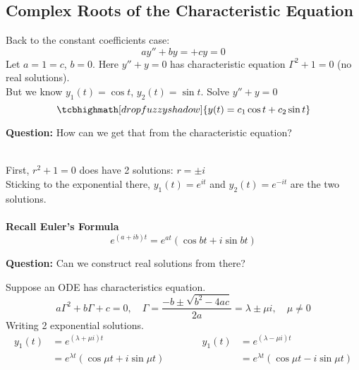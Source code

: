 \subsection*{Complex Roots of the Characteristic Equation}
Back to the constant coefficients case:
\begin{equation*}
	ay'' + by= + cy = 0 \tag{$\star$}
\end{equation*}
Let $a = 1 = c$, $b = 0$. Here $y'' + y = 0$ has characteristic equation $\Gamma^2 + 1 = 0$ (no real solutions).\\
But we know $y_1(t) = \cos t$, $y_2(t) = \sin t$. Solve $y'' + y = 0$
\begin{equation*}
	\tcbhighmath[drop fuzzy shadow]{y(t) = c_1 \cos t + c_2 \sin t}
\end{equation*}
\redhline
\begin{center}
	\textbf{Question:} How can we get that from the characteristic equation?
\end{center}
\redhline\\
First, $r^2 + 1 = 0$ does have 2 solutions: $r = \pm i$\\
Sticking to the exponential there, $y_1(t) = e^{it}$ and $y_2(t) = e^{-it}$ are the two solutions.\\\\
\textbf{Recall Euler's Formula}
\begin{equation*}
	e^{(a + ib)t} = e^{at}(\cos bt + i \sin bt)
\end{equation*}
\redhline
\begin{center}
	\textbf{Question:} Can we construct real solutions from there?
\end{center}
Suppose an ODE has characteristics equation.
\begin{equation*}
	a\Gamma^2 + b \Gamma + c = 0, \quad \Gamma = \frac{-b \pm \sqrt{b^2 - 4ac}}{2a} = \lambda \pm \mu i, \quad \mu \neq 0 
\end{equation*}
Writing 2 exponential solutions.
\begin{equation*}
	\begin{split}
			y_1(t) & = e^{(\lambda + \mu i)t}\\
			& = e^{\lambda t}(\cos \mu t + i\sin \mu t)
	\end{split}
	\quad \quad \quad 
	\begin{split}
			y_1(t) & = e^{(\lambda - \mu i)t}\\
			& = e^{\lambda t}(\cos \mu t - i\sin \mu t)
	\end{split}
\end{equation*}
